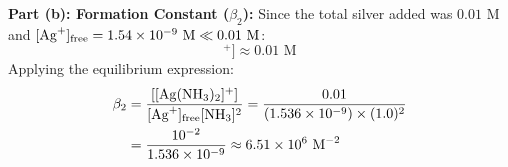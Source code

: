 \begin{examplebox}
\textbf{Part (b): Formation Constant ($\beta_2$):}
Since the total silver added was $0.01\text{ M}$ and $[\ce{Ag+}]_{\text{free}} = 1.54 \times 10^{-9}\text{ M} \ll 0.01\text{ M}$:
\begin{equation*}
    [[\ce{Ag(NH3)2}]^+] \approx 0.01\text{ M}
\end{equation*}
Applying the equilibrium expression:
\begin{align*}
    \beta_2 &= \frac{[[\ce{Ag(NH3)2}]^+]}{[\ce{Ag+}]_{\text{free}} [\ce{NH3}]^2} = \frac{0.01}{(1.536 \times 10^{-9}) \times (1.0)^2} \\
    &= \frac{10^{-2}}{1.536 \times 10^{-9}} \approx 6.51 \times 10^6\ \text{M}^{-2}
\end{align*}
\end{examplebox}
